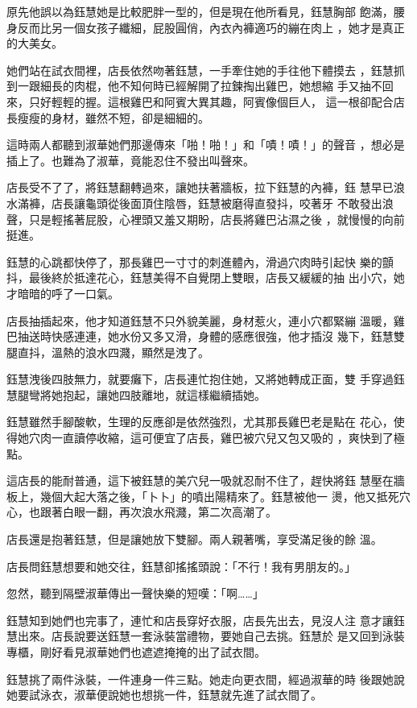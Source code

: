 原先他誤以為鈺慧她是比較肥胖一型的，但是現在他所看見，鈺慧胸部
飽滿，腰身反而比另一個女孩子纖細，屁股圓俏，內衣內褲適巧的繃在肉上
，她才是真正的大美女。

她們站在試衣間裡，店長依然吻著鈺慧，一手牽住她的手往他下體摸去
，鈺慧抓到一跟細長的肉棍，他不知何時已經解開了拉鍊掏出雞巴，她想縮
手又抽不回來，只好輕輕的握。這根雞巴和阿賓大異其趣，阿賓像個巨人，
這一根卻配合店長瘦瘦的身材，雖然不短，卻是細細的。

這時兩人都聽到淑華她們那邊傳來「啪！啪！」和「嘖！嘖！」的聲音
，想必是插上了。也難為了淑華，竟能忍住不發出叫聲來。

店長受不了了，將鈺慧翻轉過來，讓她扶著牆板，拉下鈺慧的內褲，鈺
慧早已浪水滿褲，店長讓龜頭從後面頂住陰唇，鈺慧被磨得直發抖，咬著牙
不敢發出浪聲，只是輕搖著屁股，心裡頭又羞又期盼，店長將雞巴沾濕之後
，就慢慢的向前挺進。

鈺慧的心跳都快停了，那長雞巴一寸寸的刺進體內，滑過穴肉時引起快
樂的顫抖，最後終於抵達花心，鈺慧美得不自覺閉上雙眼，店長又緩緩的抽
出小穴，她才暗暗的呼了一口氣。

店長抽插起來，他才知道鈺慧不只外貌美麗，身材惹火，連小穴都緊繃
溫暖，雞巴抽送時快感連連，她水份又多又滑，身體的感應很強，他才插沒
幾下，鈺慧雙腿直抖，溫熱的浪水四濺，顯然是洩了。

鈺慧洩後四肢無力，就要癱下，店長連忙抱住她，又將她轉成正面，雙
手穿過鈺慧腿彎將她抱起，讓她四肢離地，就這樣繼續插她。

鈺慧雖然手腳酸軟，生理的反應卻是依然強烈，尤其那長雞巴老是點在
花心，使得她穴肉一直讀停收縮，這可便宜了店長，雞巴被穴兒又包又吸的
，爽快到了極點。

這店長的能耐普通，這下被鈺慧的美穴兒一吸就忍耐不住了，趕快將鈺
慧壓在牆板上，幾個大起大落之後，「卜卜」的噴出陽精來了。鈺慧被他一
燙，他又抵死穴心，也跟著白眼一翻，再次浪水飛濺，第二次高潮了。

店長還是抱著鈺慧，但是讓她放下雙腳。兩人親著嘴，享受滿足後的餘
溫。

店長問鈺慧想要和她交往，鈺慧卻搖搖頭說：「不行！我有男朋友的。」

忽然，聽到隔壁淑華傳出一聲快樂的短嘆：「啊……」

鈺慧知到她們也完事了，連忙和店長穿好衣服，店長先出去，見沒人注
意才讓鈺慧出來。店長說要送鈺慧一套泳裝當禮物，要她自己去挑。鈺慧於
是又回到泳裝專櫃，剛好看見淑華她們也遮遮掩掩的出了試衣間。

鈺慧挑了兩件泳裝，一件連身一件三點。她走向更衣間，經過淑華的時
後跟她說她要試泳衣，淑華便說她也想挑一件，鈺慧就先進了試衣間了。

